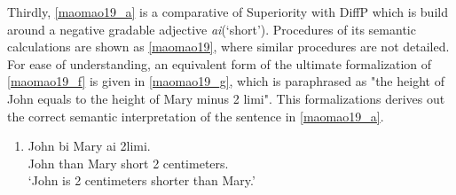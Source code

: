 \documentclass{ctexart}
\begin{document}
Thirdly, \ref{maomao19_a} is a comparative of Superiority with DiffP which is build around a negative gradable adjective \textit{ai}(`short'). Procedures of its semantic calculations are shown as \ref{maomao19}, where similar procedures are not detailed. For ease of understanding, an equivalent form of the ultimate formalization of \ref{maomao19_f} is given in \ref{maomao19_g}, which is paraphrased as "the height of John equals to the height of Mary minus 2 limi". This formalizations derives out the correct semantic interpretation of the sentence in \ref{maomao19_a}.

\begin{enumerate}
    \item \label{maomao19_a}
    John bi \enspace \enspace Mary \enspace ai \enspace \enspace 2limi. \\
    John than Mary short 2 centimeters. \\
    `John is 2 centimeters shorter than Mary.'
\end{enumerate}
\end{document}
